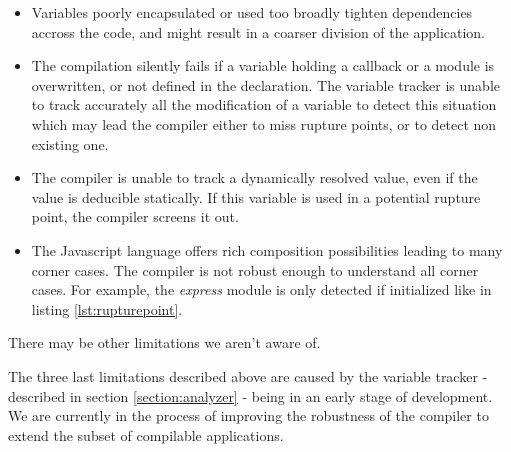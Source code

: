 \begin{itemize}
  \item Variables poorly encapsulated or used too broadly tighten dependencies accross the code, and might result in a coarser division of the application.
  \item The compilation silently fails if a variable holding a callback or a module is overwritten, or not defined in the declaration.
        The variable tracker is unable to track accurately all the modification of a variable to detect this situation which may lead the compiler either to miss rupture points, or to detect non existing one.
  \item The compiler is unable to track a dynamically resolved value, even if the value is deducible statically.
        If this variable is used in a potential rupture point, the compiler screens it out.
  \item The Javascript language offers rich composition possibilities leading to many corner cases.
        The compiler is not robust enough to understand all corner cases.
        For example, the \textit{express} module is only detected if initialized like in listing \ref{lst:rupturepoint}.
\end{itemize}
There may be other limitations we aren't aware of.

The three last limitations described above are caused by the variable tracker - described in section \ref{section:analyzer} - being in an early stage of development.
We are currently in the process of improving the robustness of the compiler to extend the subset of compilable applications.

